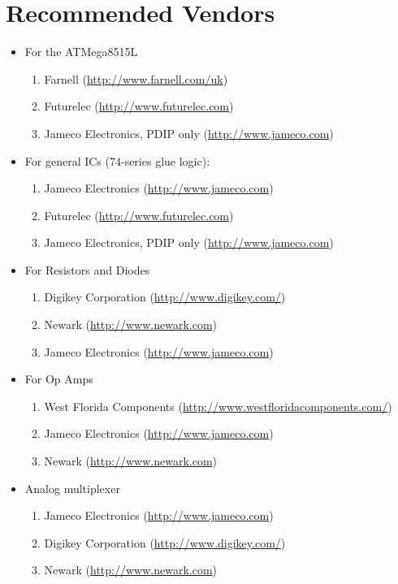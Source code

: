 \chapter{Recommended Vendors}
\begin{itemize}
\item For the ATMega8515L
\begin{enumerate}
	\item Farnell (\url{http://www.farnell.com/uk})
	\item Futurelec (\url{http://www.futurelec.com})
	\item Jameco Electronics, PDIP only (\url{http://www.jameco.com})
\end{enumerate}
\item For general ICs (74-series glue logic):
\begin{enumerate}
	\item Jameco Electronics (\url{http://www.jameco.com})
	\item Futurelec (\url{http://www.futurelec.com})
	\item Jameco Electronics, PDIP only (\url{http://www.jameco.com})
\end{enumerate}
\item For Resistors and Diodes
\begin{enumerate}
	\item Digikey Corporation (\url{http://www.digikey.com/})
	\item Newark (\url{http://www.newark.com})
	\item Jameco Electronics (\url{http://www.jameco.com})
\end{enumerate}
\item For Op Amps
\begin{enumerate}
	\item West Florida Components (\url{http://www.westfloridacomponents.com/})	
	\item Jameco Electronics (\url{http://www.jameco.com})
	\item Newark (\url{http://www.newark.com})
\end{enumerate}
\item Analog multiplexer 
\begin{enumerate}
	\item Jameco Electronics (\url{http://www.jameco.com})
	\item Digikey Corporation (\url{http://www.digikey.com/})
	\item Newark (\url{http://www.newark.com})
\end{enumerate}

\end{itemize}

